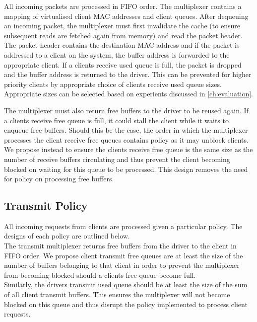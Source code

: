 All incoming packets are processed in FIFO order. The multiplexer contains a 
mapping of virtualised client MAC addresses and client queues. After dequeuing an incoming packet,
the multiplexer must first invalidate the cache (to ensure subsequent reads are fetched again from memory)
and read the packet header. The packet header contains the destination MAC address and if the packet is
addressed to a client on the system, the buffer address is forwarded to the appropriate client. 
If a clients receive used queue is full, the packet is dropped and the buffer address is returned to
the driver. This can be prevented for higher priority clients by appropriate choice of clients receive
used queue sizes. Appropriate sizes can be selected based on experients discussed in \autoref{ch:evaluation}.

The multiplexer must also return free buffers to the driver to be reused again. If a clients receive free
queue is full, it could stall the client while it waits to enqueue free buffers. Should this be the case,
the order in which the multiplexer processes the client receive free queues contains policy as it may
unblock clients. We propose instead to ensure the clients receive free queue is the same size as the number
of receive buffers circulating and thus prevent the client becoming blocked on waiting for this queue to be
processed. This design removes the need for policy on processing free buffers. \\ 

\subsection{Transmit Policy}

All incoming requests from clients are processed given a particular policy. The designs of each policy
are outlined below.\\
The transmit multiplexer returns free buffers from the driver to the client in FIFO order.
We propose client transmit free queues are at least the size of the number of buffers
belonging to that client in order to prevent the multiplexer from becoming blocked 
should a clients free queue become full. \\ 
Similarly, the drivers transmit used queue should be at least the size of the sum of 
all client transmit buffers. This ensures the multiplexer will not become blocked on this queue
and thus disrupt the policy implemented to process client requests. \\ 

